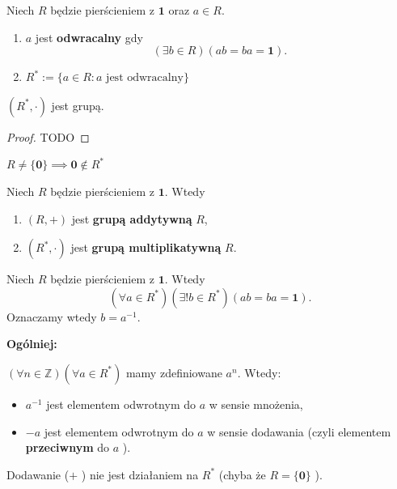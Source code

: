 \begin{definition}
	Niech $R$ będzie pierścieniem z $\mathbf{1}$ oraz $a\in R$.
	\begin{enumerate}[label=\arabic*)]
		\item $a$ jest \textbf{odwracalny} gdy
			\[
			\left(\exists b\in R \right)\left( ab = ba = \mathbf{1} \right)  
			.\] 
		\item $R^{\ast }:= \{a\in R: a \text{ jest odwracalny}\} $
	\end{enumerate}
\end{definition} 
\begin{fact}
      $\left( R^{\ast}, \cdot \right) $ jest grupą.
\end{fact}
\begin{proof}
	TODO
\end{proof} 
\begin{remark}
	$R \neq \{\mathbf{0}\} \implies \mathbf{0}\not\in R^{\ast}$
\end{remark} 
\begin{definition}
	Niech $R$ będzie pierścieniem z $\mathbf{1}$. Wtedy
	\begin{enumerate}[label=\arabic*)]
		\item $\left( R,+ \right) $ jest \textbf{grupą addytywną} $R$,
		\item $\left( R^{\ast}, \cdot  \right) $ jest \textbf{grupą multiplikatywną} $R$.
	\end{enumerate}
\end{definition} 
\begin{remark}
	Niech $R$ będzie pierścieniem z $\mathbf{1}$.
	Wtedy
	\[
	\left(\forall a \in R^{\ast} \right)\left(\exists !b\in R^{\ast} \right)\left( ab = ba = \mathbf{1} \right)   
	.\] 
	Oznaczamy wtedy $b = a^{-1}$.

	\noindent \textbf{Ogólniej:}

	$\left(\forall n\in \mathbb{Z}  \right)\left(\forall a \in R^{\ast} \right)  $ mamy zdefiniowane $a^{n}$. Wtedy:
	\begin{itemize}
		\item $a^{-1}$ jest elementem odwrotnym do $a$ w sensie mnożenia,
		\item $-a$ jest elementem odwrotnym do $a$ w sensie dodawania (czyli elementem \textbf{przeciwnym} do $a$ ).
	\end{itemize}
\end{remark}
\begin{remark}
	Dodawanie ($+$ ) nie jest działaniem na $R^{\ast}$ (chyba że $R=\{\mathbf{0}\} $ ).
\end{remark} 

